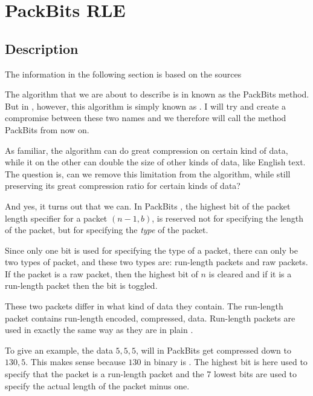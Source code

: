 \section{PackBits RLE}
\label{sec:packbits-rle}

\subsection{Description}

The information in the following section is based on the sources
\cite{96:_techn_note_tn102,apple1994inside,91:_truev_tga_file_format_specif}

The algorithm that we are about to describe is in
\cite{96:_techn_note_tn102,apple1994inside} known as the PackBits
method. But in \cite{91:_truev_tga_file_format_specif}, however, this
algorithm is simply known as \rle. I will try and create a compromise
between these two names and we therefore will call the method PackBits
\rle from now on.

As familiar, the \rle algorithm can do great compression on certain
kind of data, while it on the other can double the size of other kinds
of data, like English text. The question is, can we remove this
limitation from the algorithm, while still preserving its great
compression ratio for certain kinds of data?

And yes, it turns out that we can. In PackBits \rle, the highest bit of
the packet length specifier for a packet $(n-1,b)$, is reserved not
for specifying the length of the packet, but for specifying the
\textit{type} of the packet.

Since only one bit is used for specifying the type of a packet, there
can only be two types of packet, and these two types are: run-length
packets and raw packets. If the packet is a raw packet, then the
highest bit of $n$ is cleared and if it is a run-length packet then
the bit is toggled.

These two packets differ in what kind of data they contain. The
run-length packet contains run-length encoded, compressed,
data. Run-length packets are used in exactly the same way as they are
in plain \rle.

To give an example, the data $5,5,5$, will in PackBits \rle get
compressed down to $130,5$. This makes sense because $130$ in binary
is . The highest bit is here used to specify that the
packet is a run-length packet and the 7 lowest bits are used to
specify the actual length of the packet minus one.

